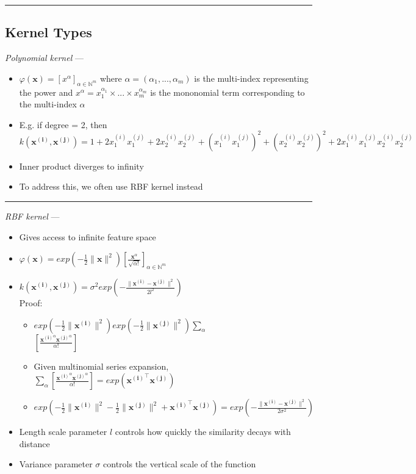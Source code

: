 {\color{black}\hrule height 0.001mm}

\subsection*{Kernel Types}
\emph{Polynomial kernel} ---
\begin{itemize}
    \item $\varphi(\boldsymbol{x}) = [ 
    x^\alpha ]_{\alpha \in \mathbb{N}^m}$ where $\alpha = (\alpha_1, ..., \alpha_m)$ is the multi-index representing the power and $x^\alpha = x_1^{\alpha_1} \times ... \times  x_m^{\alpha_m}$ is the mononomial term corresponding to the multi-index $\alpha$
    \item E.g. if degree = 2, then $k( \boldsymbol{x^{(i)}}, \boldsymbol{x^{(j)}} ) = 1 + 2 x_1^{(i)} x_1^{(j)} + 2 x_2^{(i)} x_2^{(j)} + ( x_1^{(i)} x_1^{(j)} )^2 + ( x_2^{(i)} x_2^{(j)} )^2 + 2 x_1^{(i)} x_1^{(j)} x_2^{(i)} x_2^{(j)}$
    \item Inner product diverges to infinity
    \item To address this, we often use RBF kernel instead
\end{itemize}

{\color{lightgray}\hrule height 0.001mm}

\emph{RBF kernel} ---
\begin{itemize}
    \item Gives access to infinite feature space
    \item $\varphi(\boldsymbol{x}) = exp ( -\frac{1}{2} \|\boldsymbol{x}\|^2 ) [ \frac{ \boldsymbol{x}^\alpha }{ \sqrt{\alpha!} } ]_{\alpha \in \mathbb{N}^m}$ 
    \item $k( \boldsymbol{x^{(i)}}, \boldsymbol{x^{(j)}} ) = \sigma^2 exp (- \frac{ \| \boldsymbol{x^{(i)}} - \boldsymbol{x^{(j)}} \|^2 }{ 2l^2 } )$\\
    Proof:
    \begin{itemize}
        \item $exp ( -\frac{1}{2} \|\boldsymbol{x^{(i)}}\|^2 ) exp ( -\frac{1}{2} \|\boldsymbol{x^{(j)}}\|^2 ) \sum_\alpha$\\
        $[ \frac{ \boldsymbol{x^{(i)}}^\alpha \boldsymbol{x^{(j)}}^\alpha }{ \alpha! } ]$
        \item Given multinomial series expansion, $\sum_\alpha [ \frac{ \boldsymbol{x^{(i)}}^\alpha \boldsymbol{x^{(j)}}^\alpha }{ \alpha! } ] = exp(\boldsymbol{x^{(i)}}^\intercal \boldsymbol{x^{(j)}})$
        \item $exp ( -\frac{1}{2} \|\boldsymbol{x^{(i)}}\|^2  -\frac{1}{2} \|\boldsymbol{x^{(j)}}\|^2 + \boldsymbol{x^{(i)}}^\intercal \boldsymbol{x^{(j)}}) = exp (- \frac{ \| \boldsymbol{x^{(i)}} - \boldsymbol{x^{(j)}} \|^2 }{ 2\sigma^2 } )$
    \end{itemize}
    \item Length scale parameter $l$ controls how quickly the similarity decays with distance
    \item Variance parameter $\sigma$ controls the vertical scale of the function
\end{itemize}

